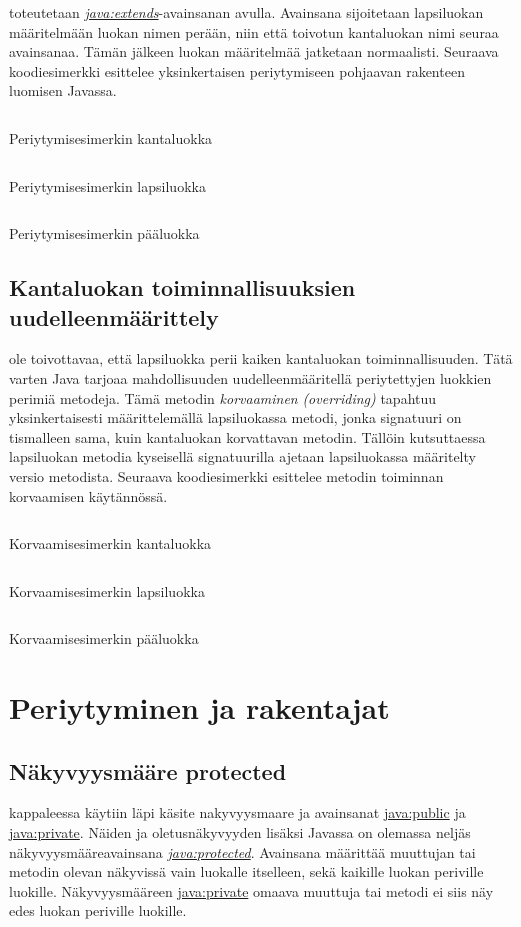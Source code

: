 \documentclass{tufte-book}
\newcommand{\eng}[1]{\textit{(#1)}}
\newcommand{\new}[1]{\textit{\gls{#1}}}
\newcommand{\neweng}[2]{\new{#1} \eng{#2}}
\newcommand{\java}[1]{\underline{\gls{java:#1}}}
\newcommand{\newjava}[1]{\textit{\java{#1}}}
\newcommand{\code}[3]{
\begin{listing}
    \inputminted{java}{OhjelmointiopasEsimerkit/src/#1/#2.java}
    \caption{#3}
    \label{Java-#1-#2}
\end{listing}
}
\begin{document}
 toteutetaan \newjava{extends}-avainsanan avulla. Avainsana
sijoitetaan lapsiluokan määritelmään luokan nimen perään, niin että toivotun kantaluokan nimi
seuraa avainsanaa. Tämän jälkeen luokan määritelmää jatketaan normaalisti. Seuraava koodiesimerkki
esittelee yksinkertaisen periytymiseen pohjaavan rakenteen luomisen Javassa.

\code{week6/basicinheritanceexample}{Parent}{Periytymisesimerkin kantaluokka}
\code{week6/basicinheritanceexample}{Child}{Periytymisesimerkin lapsiluokka}
\code{week6/basicinheritanceexample}{Main}{Periytymisesimerkin pääluokka}

\subsection{Kantaluokan toiminnallisuuksien uudelleenmäärittely}
\label{overriding}

 ole toivottavaa, että lapsiluokka perii kaiken kantaluokan toiminnallisuuden.
Tätä varten Java tarjoaa mahdollisuuden uudelleenmääritellä periytettyjen luokkien perimiä
metodeja. Tämä metodin \neweng{korvaaminen}{overriding} tapahtuu yksinkertaisesti määrittelemällä
lapsiluokassa metodi, jonka \gls{signatuuri} on tismalleen sama, kuin kantaluokan korvattavan
metodin. Tällöin kutsuttaessa lapsiluokan metodia kyseisellä signatuurilla ajetaan lapsiluokassa
määritelty versio metodista. Seuraava koodiesimerkki esittelee metodin toiminnan korvaamisen
käytännössä.

\code{week6/overridingexample}{Parent}{Korvaamisesimerkin kantaluokka}
\code{week6/overridingexample}{Child}{Korvaamisesimerkin lapsiluokka}
\code{week6/overridingexample}{Main}{Korvaamisesimerkin pääluokka}

\section{Periytyminen ja rakentajat}
\label{superprotected}

\subsection{Näkyvyysmääre protected}
\label{protected}

 kappaleessa  käytiin läpi käsite
\gls{nakyvyysmaare} ja avainsanat \java{public} ja \java{private}. Näiden ja oletusnäkyvyyden
lisäksi Javassa on olemassa neljäs näkyvyysmääreavainsana \newjava{protected}. Avainsana määrittää
muuttujan tai metodin olevan näkyvissä vain luokalle itselleen, sekä kaikille luokan periville
luokille. Näkyvyysmääreen \java{private} omaava muuttuja tai metodi ei siis näy edes luokan
periville luokille.
\end{document}
